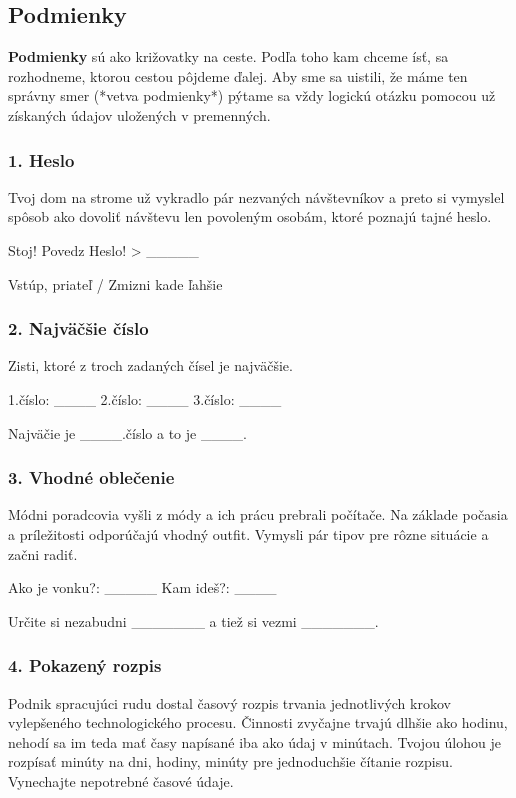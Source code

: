 \subsection{Podmienky}
\textbf{Podmienky} sú ako križovatky na ceste. Podľa toho kam chceme ísť, sa rozhodneme, ktorou cestou pôjdeme ďalej. Aby sme sa uistili, že máme ten správny smer (*vetva podmienky*) pýtame sa vždy logickú otázku pomocou už získaných údajov uložených v premenných.

\subsubsection*{1. Heslo}
Tvoj dom na strome už vykradlo pár nezvaných návštevníkov a preto si vymyslel spôsob ako dovoliť návštevu len povoleným osobám, ktoré poznajú tajné heslo.

\begin{code}
Stoj! Povedz Heslo!
> _____

Vstúp, priateľ /   Zmizni kade ľahšie
\end{code}


\subsubsection*{2. Najväčšie číslo}
Zisti, ktoré z troch zadaných čísel je najväčšie.

\begin{code}
1.číslo: ____
2.číslo: ____
3.číslo: ____

Najväčie je ____.číslo a to je ____.
\end{code}


\subsubsection*{3. Vhodné oblečenie}
Módni poradcovia vyšli z módy a ich prácu prebrali počítače. Na základe počasia a príležitosti odporúčajú vhodný outfit. Vymysli pár tipov pre rôzne situácie a začni radiť.

\begin{code}
Ako je vonku?: _____
Kam ideš?: ____

Určite si nezabudni _______ a tiež si vezmi _______.
\end{code}


\subsubsection*{4. Pokazený rozpis}
Podnik spracujúci rudu dostal časový rozpis trvania jednotlivých krokov vylepšeného technologického procesu. Činnosti zvyčajne trvajú dlhšie ako hodinu, nehodí sa im teda mať časy napísané iba ako údaj v minútach. Tvojou úlohou je rozpísať minúty na dni, hodiny, minúty pre jednoduchšie čítanie rozpisu. Vynechajte nepotrebné časové údaje.

